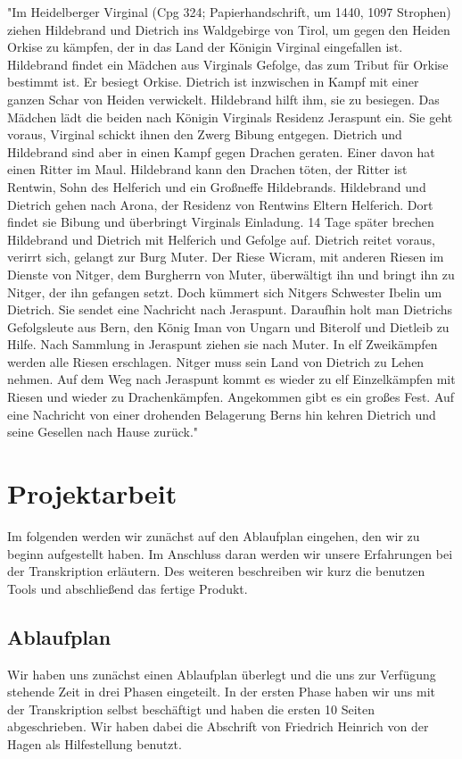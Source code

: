 \documentclass[a4paper, 12pt, oneside]{scrbook}
\begin{document}
"Im Heidelberger Virginal (Cpg 324; Papierhandschrift, um 1440, 1097 Strophen) ziehen Hildebrand und Dietrich ins Waldgebirge von Tirol, um gegen den Heiden Orkise zu kämpfen, der in das Land der Königin Virginal eingefallen ist. Hildebrand findet ein Mädchen aus Virginals Gefolge, das zum Tribut für Orkise bestimmt ist. Er besiegt Orkise. Dietrich ist inzwischen in Kampf mit einer ganzen Schar von Heiden verwickelt. Hildebrand hilft ihm, sie zu besiegen. Das Mädchen lädt die beiden nach Königin Virginals Residenz Jeraspunt ein. Sie geht voraus, Virginal schickt ihnen den Zwerg Bibung entgegen. Dietrich und Hildebrand sind aber in einen Kampf gegen Drachen geraten. Einer davon hat einen Ritter im Maul. Hildebrand kann den Drachen töten, der Ritter ist Rentwin, Sohn des Helferich und ein Großneffe Hildebrands. Hildebrand und Dietrich gehen nach Arona, der Residenz von Rentwins Eltern Helferich. Dort findet sie Bibung und überbringt Virginals Einladung. 14 Tage später brechen Hildebrand und Dietrich mit Helferich und Gefolge auf. Dietrich reitet voraus, verirrt sich, gelangt zur Burg Muter. Der Riese Wicram, mit anderen Riesen im Dienste von Nitger, dem Burgherrn von Muter, überwältigt ihn und bringt ihn zu Nitger, der ihn gefangen setzt. Doch kümmert sich Nitgers Schwester Ibelin um Dietrich. Sie sendet eine Nachricht nach Jeraspunt. Daraufhin holt man Dietrichs Gefolgsleute aus Bern, den König Iman von Ungarn und Biterolf und Dietleib zu Hilfe. Nach Sammlung in Jeraspunt ziehen sie nach Muter. In elf Zweikämpfen werden alle Riesen erschlagen. Nitger muss sein Land von Dietrich zu Lehen nehmen. Auf dem Weg nach Jeraspunt kommt es wieder zu elf Einzelkämpfen mit Riesen und wieder zu Drachenkämpfen. Angekommen gibt es ein großes Fest. Auf eine Nachricht von einer drohenden Belagerung Berns hin kehren Dietrich und seine Gesellen nach Hause zurück."\cite{wiki_virginal}

\chapter{Projektarbeit}
Im folgenden werden wir zunächst auf den Ablaufplan eingehen, den wir zu beginn aufgestellt haben. Im Anschluss daran werden wir unsere Erfahrungen bei der Transkription erläutern. Des weiteren beschreiben wir kurz die benutzen Tools und abschließend das fertige Produkt.

\section{Ablaufplan}
Wir haben uns zunächst einen Ablaufplan überlegt und die uns zur Verfügung stehende Zeit in drei Phasen eingeteilt. In der ersten Phase haben wir uns mit der Transkription selbst beschäftigt und haben die ersten 10 Seiten abgeschrieben. Wir haben dabei die Abschrift von Friedrich Heinrich von der Hagen\cite{fhvdh_helden} als Hilfestellung benutzt.
\end{document}

